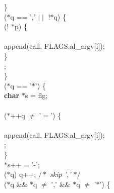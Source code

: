 \begin{flushleft}
\hspace*{9\indentation}\}\mbox{}\\
\hspace*{9\indentation}{\bf if} ($\ast$q == ',' $\mid\mid$ !$\ast$q) \{\mbox{}\\
\hspace*{12\indentation}{\bf if} (! $\ast$p) \{\mbox{}\\
\mbox{}\\
\hspace*{15\indentation}append(call, FLAGS.al\_argv[i]);\mbox{}\\
\hspace*{12\indentation}\}\mbox{}\\
\hspace*{12\indentation}{\bf break};\mbox{}\\
\hspace*{9\indentation}\}\mbox{}\\
\hspace*{9\indentation}{\bf if} ($\ast$q == '$\ast$') \{\mbox{}\\
\hspace*{12\indentation}{\bf register} {\bf char} $\ast$s = flg;\mbox{}\\
\mbox{}\\
\hspace*{12\indentation}{\bf if} ($\ast$++q $\neq$ '$=$') \{\mbox{}\\
\mbox{}\\
\hspace*{15\indentation}append(call, FLAGS.al\_argv[i]);\mbox{}\\
\hspace*{15\indentation}{\bf break};\mbox{}\\
\hspace*{12\indentation}\}\mbox{}\\
\hspace*{12\indentation}$\ast$s++ = '-';\mbox{}\\
\hspace*{12\indentation}{\bf if} ($\ast$q) q++;   {$/\ast$\it{} skip ',' $\ast/$}\mbox{}\\
\hspace*{12\indentation}{\bf while} ($\ast$q \&\& $\ast$q $\neq$ ',' \&\& $\ast$q $\neq$ '$\ast$') \{\mbox{}\\

\end{flushleft}
